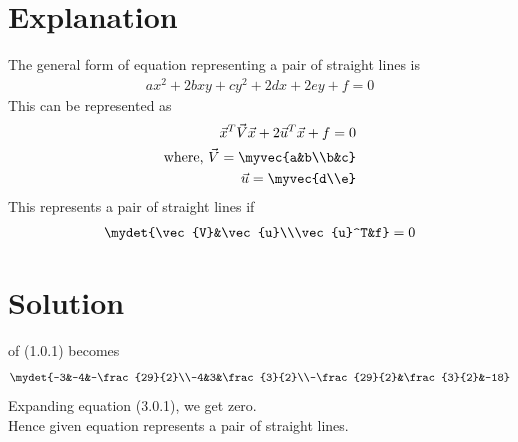 
%

\section{Explanation}
The general form of equation representing a pair of straight lines is 
\begin{align}
    ax^2+2bxy+cy^2+2dx+2ey+f=0
\end{align}
This can be represented as
\begin{align}
    \vec{x}^T\vec{V}\vec{x}+2\vec{u}^T\vec{x}+f=0\\
    \text{where, } \vec{V}=\myvec{a&b\\b&c}\\ \vec{u}=\myvec{d\\e}
\end{align}
This represents a pair of straight lines if
\begin{align}
    \mydet{\vec{V}&\vec{u}\\\vec{u}^T&f}=0
\end{align}
\section{Solution}
 of (1.0.1) becomes
\begin{align}
    \mydet{-3&-4&-\frac{29}{2}\\-4&3&\frac{3}{2}\\-\frac{29}{2}&\frac{3}{2}&-18}
\end{align}
Expanding equation (3.0.1), we get zero.\\
Hence given equation represents a pair of straight lines.
